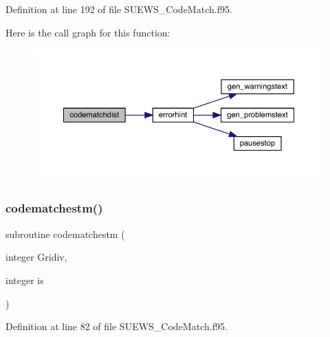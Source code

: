 Definition at line 192 of file S\+U\+E\+W\+S\+\_\+\+Code\+Match.\+f95.

Here is the call graph for this function\+:\nopagebreak
\begin{figure}[H]
\begin{center}
\leavevmode
\includegraphics[width=350pt]{_s_u_e_w_s___code_match_8f95_a3f7412f2da32ab288c3abca74c45c840_cgraph}
\end{center}
\end{figure}
\mbox{\label{_s_u_e_w_s___code_match_8f95_a690f98a34f5c8427a5f02571b24de6fe}} 
\subsubsection{\texorpdfstring{codematchestm()}{codematchestm()}}
{\footnotesize\ttfamily subroutine codematchestm (\begin{DoxyParamCaption}\item[{integer}]{Gridiv,  }\item[{integer}]{is }\end{DoxyParamCaption})}



Definition at line 82 of file S\+U\+E\+W\+S\+\_\+\+Code\+Match.\+f95.

